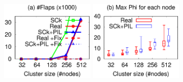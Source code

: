 


\def \fgw {1.77in}



\begin{figure}[t]





\centerline{
\hmina
\includegraphics[width=\fgw]{F/accu/eps/flap}
\hminb
\includegraphics[width=\fgw]{F/accu/eps/phi}
}
\end{figure}
